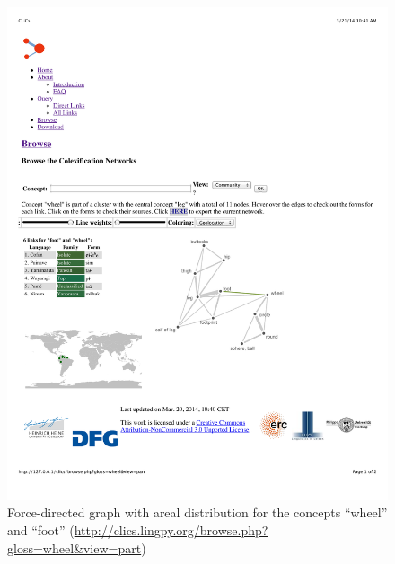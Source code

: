 \begin{figure}[htbp]
\begin{center}
\includegraphics[width=\textwidth]{img/footwheelAREAL.pdf}
\caption{Force-directed graph with areal distribution for the concepts ``wheel'' and ``foot'' (\url{http://clics.lingpy.org/browse.php?gloss=wheel&view=part})}
\label{WheelFootAreas}
\end{center}
\end{figure}


